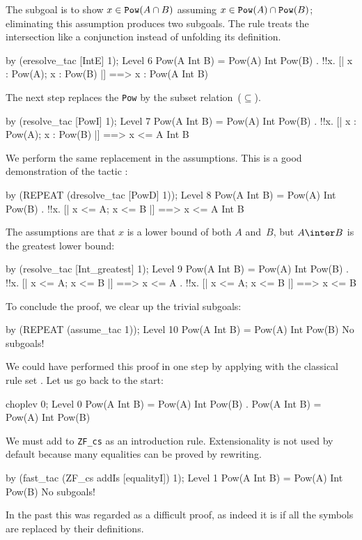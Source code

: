 The subgoal is to show $x\in {\tt Pow}(A\cap B)$ assuming $x\in{\tt
Pow}(A)\cap {\tt Pow}(B)$; eliminating this assumption produces two
subgoals.  The rule  treats the intersection like a conjunction
instead of unfolding its definition.
\begin{ttbox}
by (eresolve_tac [IntE] 1);
{\out Level 6}
{\out Pow(A Int B) = Pow(A) Int Pow(B)}
{. !!x. [| x : Pow(A); x : Pow(B) |] ==> x : Pow(A Int B)}
\end{ttbox}
The next step replaces the {\tt Pow} by the subset
relation~($\subseteq$).
\begin{ttbox}
by (resolve_tac [PowI] 1);
{\out Level 7}
{\out Pow(A Int B) = Pow(A) Int Pow(B)}
{. !!x. [| x : Pow(A); x : Pow(B) |] ==> x <= A Int B}
\end{ttbox}
We perform the same replacement in the assumptions.  This is a good
demonstration of the tactic :
\begin{ttbox}
by (REPEAT (dresolve_tac [PowD] 1));
{\out Level 8}
{\out Pow(A Int B) = Pow(A) Int Pow(B)}
{. !!x. [| x <= A; x <= B |] ==> x <= A Int B}
\end{ttbox}
The assumptions are that $x$ is a lower bound of both $A$ and~$B$, but
$A\inter B$ is the greatest lower bound:
\begin{ttbox}
by (resolve_tac [Int_greatest] 1);
{\out Level 9}
{\out Pow(A Int B) = Pow(A) Int Pow(B)}
{. !!x. [| x <= A; x <= B |] ==> x <= A}
{. !!x. [| x <= A; x <= B |] ==> x <= B}
\end{ttbox}
To conclude the proof, we clear up the trivial subgoals:
\begin{ttbox}
by (REPEAT (assume_tac 1));
{\out Level 10}
{\out Pow(A Int B) = Pow(A) Int Pow(B)}
{\out No subgoals!}
\end{ttbox}
\medskip
We could have performed this proof in one step by applying
 with the classical rule set .  Let us
go back to the start:
\begin{ttbox}
choplev 0;
{\out Level 0}
{\out Pow(A Int B) = Pow(A) Int Pow(B)}
{. Pow(A Int B) = Pow(A) Int Pow(B)}
\end{ttbox}
We must add  to {\tt ZF_cs} as an introduction rule.
Extensionality is not used by default because many equalities can be proved
by rewriting.
\begin{ttbox}
by (fast_tac (ZF_cs addIs [equalityI]) 1);
{\out Level 1}
{\out Pow(A Int B) = Pow(A) Int Pow(B)}
{\out No subgoals!}
\end{ttbox}
In the past this was regarded as a difficult proof, as indeed it is if all
the symbols are replaced by their definitions.
\goodbreak

